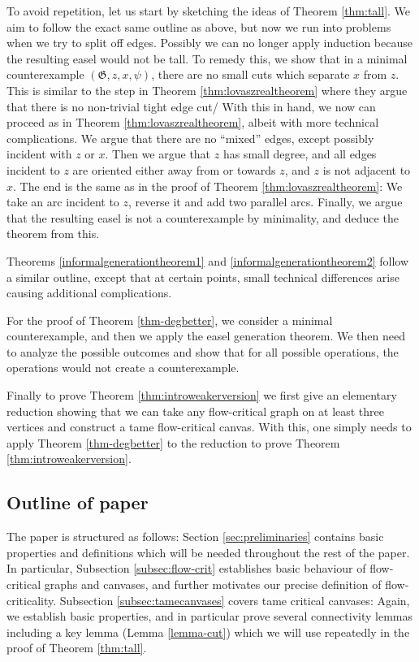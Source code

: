 \documentclass{article}
\newcommand\g{\mathfrak{G}}
\begin{document}
To avoid repetition, let us start by sketching the ideas of Theorem
\ref{thm:tall}. We aim to follow the exact same outline as above, but now we
run into problems when we try to split off edges. Possibly we can no longer
apply induction because the resulting easel would not be tall. To remedy this,
we show that in a minimal counterexample $(\g,z,x,\psi)$, there are no small
cuts which separate $x$ from $z$. This is similar to the step in Theorem
\ref{thm:lovaszrealtheorem} where they argue that there is no non-trivial tight edge cut/
With this in hand, we now can
proceed as in Theorem \ref{thm:lovaszrealtheorem}, albeit with more technical
complications. We argue that there are no ``mixed'' edges, except possibly incident with
$z$ or $x$. Then we argue that $z$ has small degree, and all edges incident to
$z$ are oriented either away from or towards $z$, and $z$ is not adjacent to
$x$. The end is the same as in the proof of Theorem
\ref{thm:lovaszrealtheorem}: We take an arc incident to $z$, reverse it and add
two parallel arcs. Finally, we argue that the resulting easel is not a
counterexample by minimality, and deduce the theorem from this.

Theorems \ref{informalgenerationtheorem1} and \ref{informalgenerationtheorem2} follow a similar outline, except that at certain points, small technical differences arise causing additional complications. 

For the proof of Theorem \ref{thm-degbetter}, we consider a minimal
counterexample, and then we apply the easel generation theorem. We then need to
analyze the possible outcomes and show that for all possible operations, the
operations would not create a counterexample.

Finally to prove Theorem \ref{thm:introweakerversion} we first give an
elementary reduction showing that we can take any flow-critical graph on at
least three vertices and construct a tame flow-critical canvas. With this, one
simply needs to apply Theorem \ref{thm-degbetter} to the reduction to prove
Theorem \ref{thm:introweakerversion}. 

\subsection{Outline of paper}\label{subsec:paperoutline}
The paper is structured as follows: Section \ref{sec:preliminaries} contains
basic properties and definitions which will be needed throughout the rest of
the paper. In particular, Subsection \ref{subsec:flow-crit}  establishes basic
behaviour of flow-critical graphs and canvases, and further motivates our
precise definition of flow-criticality. Subsection \ref{subsec:tamecanvases}
covers tame critical canvases: Again, we establish basic properties, and in
particular prove several connectivity lemmas including a key lemma (Lemma
\ref{lemma-cut}) which we will use repeatedly in the proof of Theorem
\ref{thm:tall}.
\end{document}
